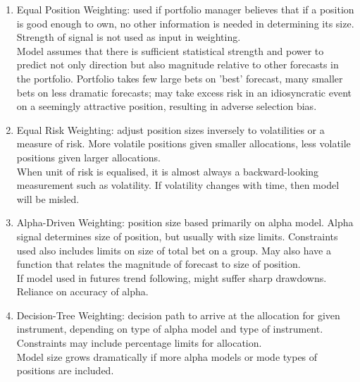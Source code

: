 \documentclass[a4paper,oneside,openany]{book}
\begin{document}
\begin{definition} 
\begin{enumerate}[label=\roman*.]
\setlength{\itemsep}{0pt}
\item Equal Position Weighting: used if portfolio manager believes that if a position is good enough to own, no other information is needed in determining its size. Strength of signal is not used as input in weighting.\\
Model assumes that there is sufficient statistical strength and power to predict not only direction but also magnitude relative to other forecasts in the portfolio. Portfolio takes few large bets on 'best' forecast, many smaller bets on less dramatic forecasts; may take excess risk in an idiosyncratic event on a seemingly attractive position, resulting in adverse selection bias.
\item Equal Risk Weighting: adjust position sizes inversely to volatilities or a measure of risk. More volatile positions given smaller allocations, less volatile positions given larger allocations.\\
When unit of risk is equalised, it is almost always a backward-looking measurement such as volatility. If volatility changes with time, then model will be misled.
\item Alpha-Driven Weighting: position size based primarily on alpha model. Alpha signal determines size of position, but usually with size limits. Constraints used also includes limits on size of total bet on a group. May also have a function that relates the magnitude of forecast to size of position.\\
If model used in futures trend following, might suffer sharp drawdowns. Reliance on accuracy of alpha.
\item Decision-Tree Weighting: decision path to arrive at the allocation for given instrument, depending on type of alpha model and type of instrument. Constraints may include percentage limits for allocation.\\
Model size grows dramatically if more alpha models or mode types of positions are included.
\end{enumerate}
\end{definition}
\end{document}
